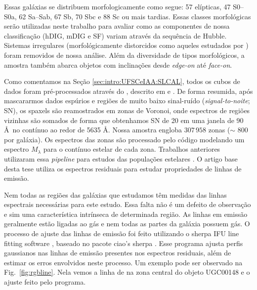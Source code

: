 Essas galáxias se distribuem morfologicamente como segue: 57 elípticas, 47 S0--S0a, 62 Sa--Sab, 67 Sb, 70 Sbc e 88 Sc ou mais tardias. Essas classes morfológicas serão utilizadas neste trabalho para avaliar como as componentes de nossa classificação (hDIG, mDIG e SF) variam através da sequência de Hubble. Sistemas irregulares (morfológicamente distorcidos como aqueles estudados por \citealt{Wild.etal.2014, BB.etal.2015b, BB.etal.2015a, CortijoFerrero.etal.2017b, CortijoFerrero.etal.2017a}) foram removidos de nossa análise. Além da diversidade de tipos morfológicos, a amostra também abarca objetos com inclinações desde {\em edge-on} até {\em face-on}.

Como comentamos na Seção \ref{sec:intro:UFSCeIAA:SLCAL}, todos os cubos de dados foram pré-processados através do \pycasso, descrito em \citet{CidFernandes.etal.2013a} e \citet{deAmorim.etal.2017}. De forma resumida, após mascararmos dados espúrios e regiões de muito baixo sinal-ruído ({\em signal-to-noite}; SN), os spaxels são reamostrados em zonas de Voronoi, onde espectros de regiões vizinhas são somados de forma que obtenhamos SN de 20 em uma janela de 90 \AA\ no contínuo ao redor de 5635 \AA. Nossa amostra engloba $307\,958$ zonas ($\sim$ 800 por galáxia). Os espectros das zonas são processado pelo código \starlight \citep{CidFernandes.etal.2005a} modelando um espectro $M_\lambda$ para o contínuo estelar de cada zona. Trabalhos anteriores utilizaram essa {\em pipeline} para estudos das populações estelares \citep{Perez.etal.2013, GonzalezDelgado.etal.2014b, GonzalezDelgado.etal.2015a, GonzalezDelgado.etal.2016a, GonzalezDelgado.etal.2017}. O artigo base desta tese utiliza os espectros residuais para estudar propriedades de linhas de emissão.

Nem todas as regiões das galáxias que estudamos têm medidas das linhas espectrais necessárias para este estudo. Essa falta não é um defeito de observação e sim uma característica intrínseca de determinada região. As linhas em emissão geralmente estão ligadas ao gás e nem todas as partes da galáxia possuem gás. O processo de ajuste das linhas de emissão foi feito utilizando o {\sc sherpa} IFU line fitting software \citep[SHIFU;][]{RGB.etal.2017}, baseado no pacote {\sc ciao's sherpa} \citep{Freeman.etal.2001, Doe.etal.2007}. Esse programa ajusta perfis gaussianos nas linhas de emissão presentes nos espectros residuais, além de estimar os erros envolvidos neste processo. Um exemplo pode ser observado na Fig.\ \ref{fig:rgbline}. Nela vemos a linha de \Hb na zona central do objeto UGC00148 e o ajuste feito pelo programa.

